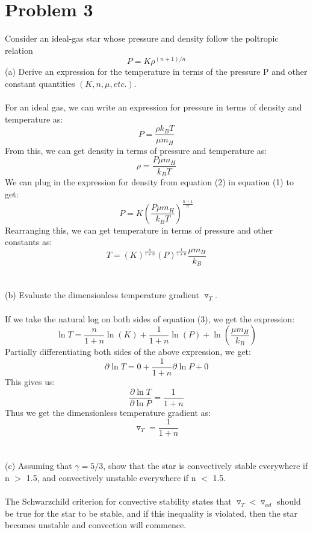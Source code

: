 \documentclass[10pt]{article}
\begin{document}
\section*{Problem 3}
Consider an ideal-gas star whose pressure and density follow the poltropic relation
\begin{equation}
    P = K \rho^{(n+1)/n} \tag{1}
\end{equation}
(a) Derive an expression for the temperature in terms of the pressure P and other constant quantities $(K , n, \mu, etc.)$.\\ \\
For an ideal gas, we can write an expression for pressure in terms of density and temperature as:
\[P = \frac{\rho k_{B} T}{\mu m_{H}}\]
From this, we can get density in terms of pressure and temperature as:
\begin{equation}
    \rho = \frac{P \mu m_{H}}{k_{B} T}  \tag{2}
\end{equation}
We can plug in the expression for density from equation (2) in equation (1) to get:
\[ P = K (\frac{P \mu m_{H}}{k_{B} T})^{\frac{n + 1}{n}}\]
Rearranging this, we can get temperature in terms of pressure and other constants as:
\begin{equation}
    T = (K)^{\frac{n}{1+n}} (P)^{\frac{1}{1+n}} \frac{\mu m_{H}}{k_{B}} \tag{3}
\end{equation}
\\ \\
(b) Evaluate the dimensionless temperature gradient $\triangledown_{T}$.\\ \\
If we take the natural log on both sides of equation (3), we get the expression:
\[ \ln{T} = \frac{n}{1+n} \ln{(K)} + \frac{1}{1+n} \ln{(P)} + \ln{(\frac{\mu m_{H}}{k_{B}})}\]
Partially differentiating both sides of the above expression, we get:
\[ \partial \ln{T} = 0 + \frac{1}{1+n} \partial \ln{P} + 0\]
This gives us:
\[ \frac{\partial \ln{T}}{\partial \ln{P}} = \frac{1}{1+n}\]
Thus we get the dimensionless temperature gradient as:
\[ \triangledown_{T} = \frac{1}{1+n}\]
\\ \\
(c) Assuming that $\gamma = 5/3$, show that the star is convectively stable everywhere if n $>$ 1.5, and convectively unstable everywhere if n $<$ 1.5. \\ \\
The Schwarzchild criterion for convective stability states that $\triangledown_{T} < \triangledown_{ad}$ should be true for the star to be stable, and if this inequality is violated, then the star becomes unstable and convection will commence.\\
\end{document}
